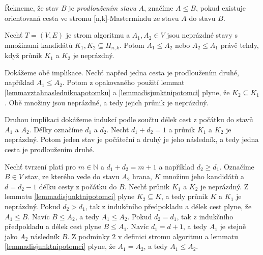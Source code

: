 \begin{definice}
    Řekneme, že stav $B$ je \emph{prodloužením stavu} $A$, značíme $A \leq B$, pokud existuje orientovaná cesta ve stromu [n,k]-Mastermindu ze stavu $A$ do stavu $B$. 
\end{definice}


\begin{lemma}\label{lemmaprunikacestastromalg}
    Nechť $T = (V,E)$ je strom algoritmu a $A_1, A_2 \in V$ jsou neprázdné stavy s množinami kandidátů $K_1, K_2 \subseteq H_{n,k}$. Potom $A_1 \leq A_2$ nebo $A_2 \leq A_1$ právě tehdy, když průnik $K_1$ a $K_2$ je neprázdný.
\end{lemma}
\begin{dukaz}
    Dokážeme obě implikace. Nechť napřed jedna cesta je prodloužením druhé, například $A_1 \leq A_2$. Potom z opakovaného použití lemmat \ref{lemmavztahnaslednikuapotomku} a \ref{lemmadisjunktnipotomci} plyne, že $K_2 \subseteq K_1$. Obě množiny jsou neprázdné, a tedy jejich průnik je neprázdný. 

    Druhou implikaci dokážeme indukcí podle součtu délek cest z počátku do stavů $A_1$ a $A_2$. Délky označíme $d_1$ a $d_2$. Nechť $d_1 + d_2 = 1$ a průnik $K_1$ a $K_2$ je neprázdný. Potom jeden stav je počáteční a druhý je jeho následník, a tedy jedna cesta je prodloužením druhé.


    Nechť tvrzení platí pro $m \in \mathbb{N}$ a $d_1 + d_2 = m+1$ a například $d_2 \geq d_1$. Označíme $B \in V$ stav, ze kterého vede do stavu $A_2$ hrana, $K$ množinu jeho kandidátů a $d = d_2-1$ délku cesty z počátku do $B$. Nechť průnik $K_1$ a $K_2$ je neprázdný. Z lemmatu \ref{lemmadisjunktnipotomci} plyne $K_2 \subseteq K$, a tedy průnik $K$ a $K_1$ je neprázdný. Pokud $d_2 > d_1$, tak z indukčního předpokladu a délek cest plyne, že $A_1 \leq B$. Navíc $B\leq A_2$, a tedy $A_1 \leq A_2$. Pokud $d_2 = d_1$, tak z indukčního předpokladu a délek cest plyne $B \leq A_1$. Navíc $d_1 = d+1$, a tedy $A_1$ je stejně jako $A_2$ následník $B$. Z podmínky $2$ v definici stromu algoritmu a lemmatu \ref{lemmadisjunktnipotomci} plyne, že $A_1 = A_2$, a tedy $A_1 \leq A_2$. 
\end{dukaz}



